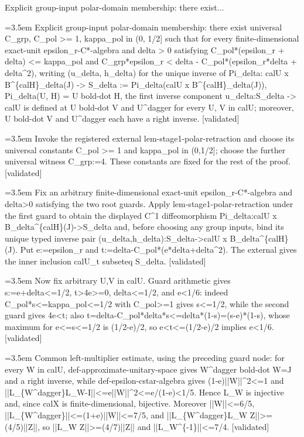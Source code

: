 \documentclass{article}
\newcommand{\step}[1]{\par\noindent\hangindent=3.5em\hangafter=1%
  \makebox[3.5em][l]{\textbf{#1.}}}
\newcommand{\steptag}[1]{\hfill{\small\textsf{[#1]}}}
\begin{document}
\begin{proofbox}{Explicit group-input polar-domain membership: there exist...}
\step{1} Explicit group-input polar-domain membership: there exist universal C\_grp, C\_pol >= 1, kappa\_pol in (0, 1/2] such that for every finite-dimensional exact-unit epsilon\_r-C*-algebra and delta > 0 satisfying C\_pol*(epsilon\_r + delta) <= kappa\_pol and C\_grp*epsilon\_r < delta - C\_pol*(epsilon\_r*delta + delta\textasciicircum{}2), writing (u\_delta, h\_delta) for the unique inverse of Pi\_delta: calU x B\textasciicircum{}\{calH\}\_delta(J) -> S\_delta := Pi\_delta(calU x B\textasciicircum{}\{calH\}\_delta(J)), Pi\_delta(U, H) = U bold-dot H, the first inverse component u\_delta:S\_delta -> calU is defined at U bold-dot V and U\textasciicircum{}dagger for every U, V in calU; moreover, U bold-dot V and U\textasciicircum{}dagger each have a right inverse. \steptag{validated} \\[6pt]
\step{1.1} Invoke the registered external lem-stage1-polar-retraction and choose its universal constants C\_pol >= 1 and kappa\_pol in (0,1/2]; choose the further universal witness C\_grp:=4. These constants are fixed for the rest of the proof. \steptag{validated} \\[4pt]
\step{1.2} Fix an arbitrary finite-dimensional exact-unit epsilon\_r-C*-algebra and delta>0 satisfying the two root guards. Apply lem-stage1-polar-retraction under the first guard to obtain the displayed C\textasciicircum{}1 diffeomorphism Pi\_delta:calU x B\_delta\textasciicircum{}\{calH\}(J)->S\_delta and, before choosing any group inputs, bind its unique typed inverse pair (u\_delta,h\_delta):S\_delta->calU x B\_delta\textasciicircum{}\{calH\}(J). Put e:=epsilon\_r and t:=delta-C\_pol*(e*delta+delta\textasciicircum{}2). The external gives the inner inclusion calU\_t subseteq S\_delta. \steptag{validated} \\[4pt]
\step{1.3} Now fix arbitrary U,V in calU. Guard arithmetic gives s:=e+delta<=1/2, t>4e>=0, delta<=1/2, and e<1/6: indeed C\_pol*s<=kappa\_pol<=1/2 with C\_pol>=1 gives s<=1/2, while the second guard gives 4e<t; also t=delta-C\_pol*delta*s<=delta*(1-s)=(s-e)*(1-s), whose maximum for e<=s<=1/2 is (1/2-e)/2, so e<t<=(1/2-e)/2 implies e<1/6. \steptag{validated} \\[4pt]
\step{1.4} Common left-multiplier estimate, using the preceding guard node: for every W in calU, def-approximate-unitary-space gives W\textasciicircum{}dagger bold-dot W=J and a right inverse, while def-epsilon-cstar-algebra gives (1-e)||W||\textasciicircum{}2<=1 and ||L\_\{W\textasciicircum{}dagger\}L\_W-I||<=e||W||\textasciicircum{}2<=e/(1-e)<1/5. Hence L\_W is injective and, since calX is finite-dimensional, bijective. Moreover ||W||<=6/5, ||L\_\{W\textasciicircum{}dagger\}||<=(1+e)||W||<=7/5, and ||L\_\{W\textasciicircum{}dagger\}L\_W Z||>=(4/5)||Z||, so ||L\_W Z||>=(4/7)||Z|| and ||L\_W\textasciicircum{}\{-1\}||<=7/4. \steptag{validated} \\[4pt]

\end{proofbox}
\end{document}
